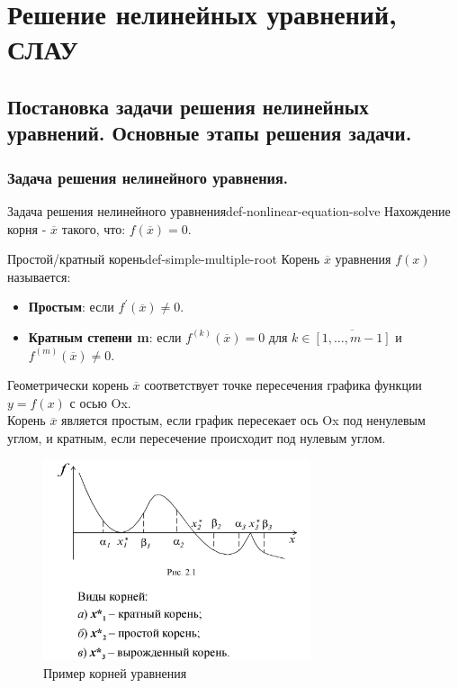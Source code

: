 \documentclass[14pt]{extarticle}
\begin{document}
\section{Решение нелинейных уравнений, СЛАУ}

\subsection{Постановка задачи решения нелинейных уравнений. Основные этапы решения задачи.}

    \subsubsection{Задача решения нелинейного уравнения.}

        \begin{definition}{Задача решения нелинейного уравнения}{def-nonlinear-equation-solve}
            Нахождение корня - $\overline{x}$ такого, что: $f(\overline{x}) = 0$.
        \end{definition}

        \begin{definition}{Простой/кратный корень}{def-simple-multiple-root}
            Корень $\overline{x}$ уравнения $f(x)$ называется:
            \begin{itemize}
                \item \textbf{Простым}: если $f^{'}(\overline{x}) \neq 0$.
                \item \textbf{Кратным степени m}: если $f^{(k)}(\overline{x}) = 0$ для $k \in \overline{[1, \ldots, m-1]}$ и $f^{(m)}(\overline{x}) \neq 0$.
            \end{itemize}
        \end{definition}

        Геометрически корень $\overline{x}$ соответствует точке пересечения графика функции $y = f(x)$ с осью Ox.\\ 
        Корень $\overline{x}$ является простым, если график пересекает ось Ox под ненулевым углом, и кратным, если пересечение происходит под нулевым углом.

        \begin{figure}[H]
            \centering
            \includegraphics[width=0.7\textwidth]{images/roots-ex.png}
            \caption{Пример корней уравнения}
            \label{fig:roots-example}
        \end{figure}
\end{document}
